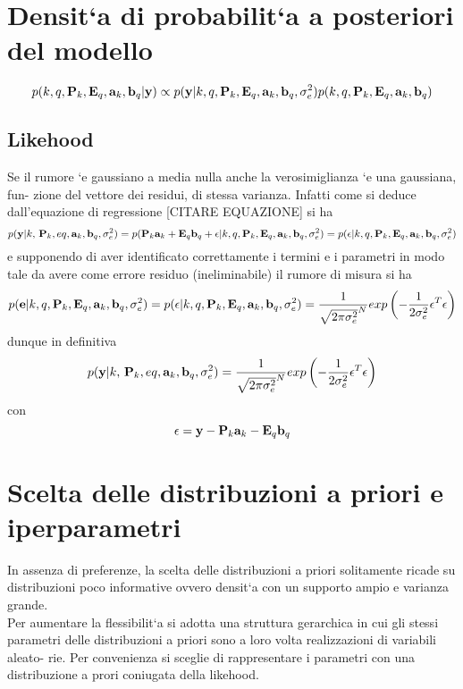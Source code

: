 \section{Densit`a di probabilit`a a posteriori del modello}
\begin{equation}
p(k, q, \textbf{P}_k , \textbf{E}_q, \textbf{a}_k , \textbf{b}_q |\textbf{y}) \propto p(\textbf{y}|k, q, \textbf{P}_k ,\textbf{E}_q , \textbf{a}_k, \textbf{b}_q , \sigma_e^2 )p(k, q, \textbf{P}_k, \textbf{E}_q,\textbf{a}_k,\textbf{b}_q )
\end{equation}
\subsection{Likehood}
Se il rumore `e gaussiano a media nulla anche la verosimiglianza `e una gaussiana, fun-
zione del vettore dei residui, di stessa varianza. Infatti come si deduce dall’equazione
di regressione [CITARE EQUAZIONE] si ha
\begin{equation}
p(\textbf{y}|k,\,\textbf{P}_k,eq,\textbf{a}_k,\textbf{b}_q,\sigma_e^2)=p(\textbf{P}_k\textbf{a}_k+\textbf{E}_q\textbf{b}_q+\epsilon|k,q,\textbf{P}_k,\textbf{E}_q,\textbf{a}_k,\textbf{b}_q,\sigma_e^2)=p(\epsilon|k,q,\textbf{P}_k,\textbf{E}_q,\textbf{a}_k,\textbf{b}_q,\sigma_e^2)
\end{equation}
e supponendo di aver identificato correttamente i termini e i parametri in modo tale
da avere come errore residuo (ineliminabile) il rumore di misura si ha
\begin{equation}
p(\textbf{e}|k, q, \textbf{P}_k , \textbf{E}_q , \textbf{a}_k , \textbf{b}_q , \sigma_e^2 ) = p(\epsilon |k, q, \textbf{P}_k , \textbf{E}_q , \textbf{a}_k , \textbf{b}_q , \sigma_e^2 )=\frac{1}{\sqrt{2\pi\sigma_e^2}^N}exp\left(-\frac{1}{2\sigma_e^2}\epsilon^T\epsilon\right)
\end{equation}
dunque in definitiva
\begin{equation}
p(\textbf{y}|k,\,\textbf{P}_k,eq,\textbf{a}_k,\textbf{b}_q,\sigma_e^2)=\frac{1}{\sqrt{2\pi\sigma_e^2}^N}exp\left(-\frac{1}{2\sigma_e^2}\epsilon^T\epsilon\right)
\end{equation}
con
\begin{equation}
\epsilon=\textbf{y}-\textbf{P}_k\textbf{a}_k-\textbf{E}_q\textbf{b}_q
\end{equation}
\section{Scelta delle distribuzioni a priori e iperparametri}
In assenza di preferenze, la scelta delle distribuzioni a priori solitamente ricade su
distribuzioni poco informative ovvero densit`a con un supporto ampio e varianza
grande.\\
Per aumentare la flessibilit`a si adotta una struttura gerarchica in cui gli stessi
parametri delle distribuzioni a priori sono a loro volta realizzazioni di variabili aleato-
rie. Per convenienza si sceglie di rappresentare i parametri con una distribuzione a
prori coniugata della likehood.
